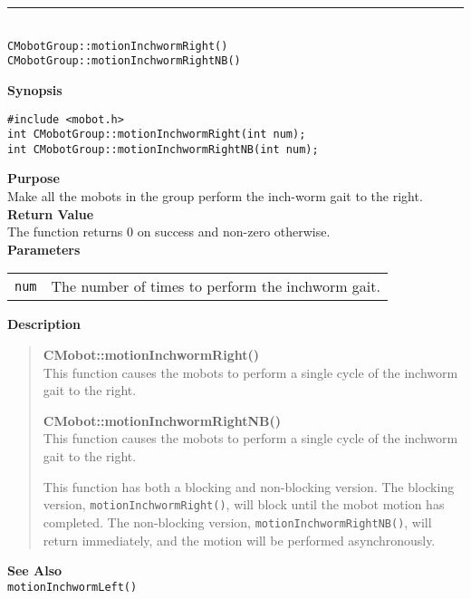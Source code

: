 \noindent
\vspace{5pt}
\rule{4.5in}{0.015in}\\
\noindent
{\LARGE \texttt{CMobotGroup::motionInchwormRight()}}\\
{\LARGE \texttt{CMobotGroup::motionInchwormRightNB()}}\\
{}

\noindent
{\bf Synopsis}
\vspace{-8pt}
\begin{verbatim}
#include <mobot.h>
int CMobotGroup::motionInchwormRight(int num);
int CMobotGroup::motionInchwormRightNB(int num);
\end{verbatim}

\noindent
{\bf Purpose}\\
Make all the mobots in the group perform the inch-worm gait to the right.\\

\noindent
{\bf Return Value}\\
The function returns 0 on success and non-zero otherwise.\\

\noindent
{\bf Parameters}\\
\vspace{-0.1in}
\begin{description}
\item               
\begin{tabular}{p{15 mm}p{145 mm}}
\texttt{num} & The number of times to perform the inchworm gait.\\
\end{tabular}
\end{description}

\noindent
{\bf Description}\\
\vspace{-12pt}
\begin{quote}
{\bf CMobot::motionInchwormRight()}\\
This function causes the mobots to perform a single cycle of the inchworm gait
to the right. 

{\bf CMobot::motionInchwormRightNB()}\\
This function causes the mobots to perform a single cycle of the inchworm gait
to the right. 

This function has both a blocking and non-blocking version.
The blocking version, \texttt{motionInchwormRight()}, will block until the
mobot motion has completed. The non-blocking version, \texttt{motionInchwormRightNB()},
will return immediately, and the motion will be performed asynchronously.\\
\end{quote}

\noindent
{\bf See Also}\\
\texttt{motionInchwormLeft()}

